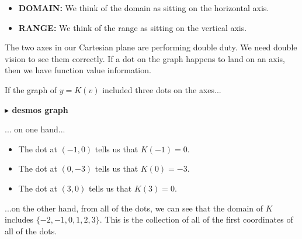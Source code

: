 \documentclass{ximera}
\begin{document}
\begin{itemize}
\item \textbf{DOMAIN:} We think of the domain as sitting on the horizontal axis.
\item \textbf{RANGE:} We think of the range as sitting on the vertical axis.
\end{itemize}


The two axes in our Cartesian plane are performing double duty.  We need double vision to see them correctly. If a dot on the graph happens to land on an axis, then we have function value information.

If the graph of $y=K(v)$ included three dots on the axes...

\begin{image}
\end{image}






\textbf{\textcolor{blue!55!black}{$\blacktriangleright$ desmos graph}} 
\begin{center}
\end{center}



... on one hand...

\begin{itemize}
\item The dot at $(-1,0)$ tells us that $K(-1) = 0$.
\item The dot at $(0,-3)$ tells us that $K(0) = -3$.
\item The dot at $(3,0)$ tells us that $K(3) = 0$.
\end{itemize}


...on the other hand, from all of the dots, we can see that the domain of $K$ includes $\{ -2, -1, 0, 1, 2, 3 \}$.  This is the collection of all of the first coordinates of all of the dots.
\end{document}
